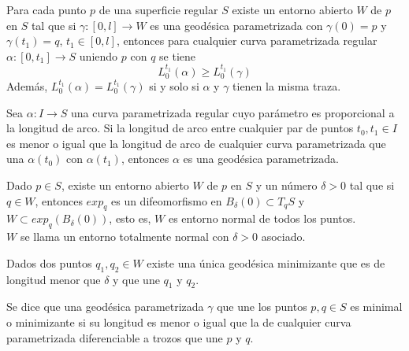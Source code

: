 \begin{corollary}
    Para cada punto $p$ de una superficie regular $S$ existe un entorno abierto $W$ de $p$ en $S$ tal que si $\gamma : [0, l] \to W$ es una geodésica parametrizada con $\gamma(0) = p$ y $\gamma(t_1) = q$, $t_1 \in [0, l]$, entonces para cualquier curva parametrizada regular $\alpha : [0, t_1] \to S$ uniendo $p$ con $q$ se tiene
    $$L^{t_1}_0(\alpha) \geq L^{t_1}_0(\gamma)$$
    Además, $L^{t_1}_0(\alpha) = L^{t_1}_0(\gamma)$ si y solo si $\alpha$ y $\gamma$ tienen la misma traza.
\end{corollary}

\begin{proposition}
    Sea $\alpha : I \to S$ una curva parametrizada regular cuyo parámetro es proporcional a la longitud de arco.
    Si la longitud de arco entre cualquier par de puntos $t_0, t_1 \in I$ es menor o igual que la longitud de arco de cualquier curva parametrizada que una $\alpha(t_0)$ con $\alpha(t_1)$, entonces $\alpha$ es una geodésica parametrizada.
\end{proposition}

\begin{proposition}
    Dado $p \in S$, existe un entorno abierto $W$ de $p$ en $S$ y un número $\delta>0$ tal que si $q \in W$, entonces $exp_q$ es un difeomorfismo en $B_\delta(0) \subset T_qS$ y $W \subset exp_q(B_\delta(0))$, esto es, $W$ es entorno normal de todos los puntos.\\
    $W$ se llama un entorno totalmente normal con $\delta>0$ asociado.
\end{proposition}

\begin{corollary}
    Dados dos puntos $q_1, q_2 \in W$ existe una única geodésica minimizante que es de longitud menor que $\delta$ y que une $q_1$ y $q_2$.
\end{corollary}

\begin{definition}
    Se dice que una geodésica parametrizada $\gamma$ que une los puntos $p, q \in S$ es minimal o minimizante si su longitud es menor o igual que la de cualquier curva parametrizada diferenciable a trozos que une $p$ y $q$.
\end{definition}